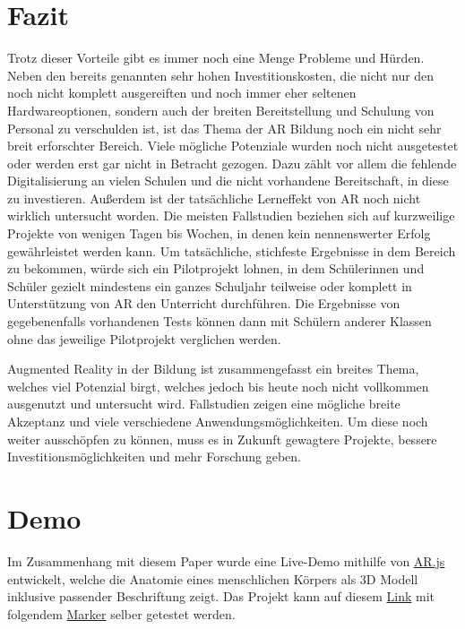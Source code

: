 \documentclass[conference]{IEEEtran}
\begin{document}
\section{Fazit}
Trotz dieser Vorteile gibt es immer noch eine Menge Probleme und Hürden. Neben den bereits genannten sehr hohen Investitionskosten, die nicht nur den noch nicht komplett ausgereiften
und noch immer eher seltenen Hardwareoptionen, sondern auch der breiten Bereitstellung und Schulung von Personal zu verschulden ist, ist das Thema der AR Bildung noch ein nicht sehr
breit erforschter Bereich. Viele mögliche Potenziale wurden noch nicht ausgetestet oder werden erst gar nicht in Betracht gezogen. Dazu zählt vor allem die fehlende Digitalisierung 
an vielen Schulen und die nicht vorhandene Bereitschaft, in diese zu investieren. Außerdem ist der tatsächliche Lerneffekt von AR noch nicht wirklich untersucht worden. Die meisten Fallstudien beziehen sich auf kurzweilige Projekte von wenigen Tagen bis Wochen, in denen kein nennenswerter Erfolg gewährleistet werden kann. Um tatsächliche, stichfeste Ergebnisse in dem Bereich zu bekommen, würde sich ein Pilotprojekt lohnen, in dem Schülerinnen und Schüler gezielt mindestens ein ganzes Schuljahr teilweise oder komplett in Unterstützung von AR den Unterricht durchführen.
Die Ergebnisse von gegebenenfalls vorhandenen Tests können dann mit Schülern anderer Klassen ohne das jeweilige Pilotprojekt verglichen werden.

Augmented Reality in der Bildung ist zusammengefasst ein breites Thema, welches viel Potenzial birgt, welches jedoch bis heute noch nicht vollkommen ausgenutzt und untersucht wird.
Fallstudien zeigen eine mögliche breite Akzeptanz und viele verschiedene Anwendungsmöglichkeiten. Um diese noch weiter ausschöpfen zu können, muss es in Zukunft gewagtere Projekte, 
bessere Investitionsmöglichkeiten und mehr Forschung geben.

\section{Demo}
\label{demo}
Im Zusammenhang mit diesem Paper wurde eine Live-Demo mithilfe von \href{https://ar-js-org.github.io/AR.js-Docs/}{AR.js} entwickelt, welche die Anatomie eines menschlichen 
Körpers als 3D Modell inklusive passender Beschriftung zeigt. Das Projekt kann auf diesem \href{https://lydr.io/ar}{Link} mit folgendem \href{https://lydr.io/ar/hiro.png}{Marker} selber getestet werden.
\end{document}
